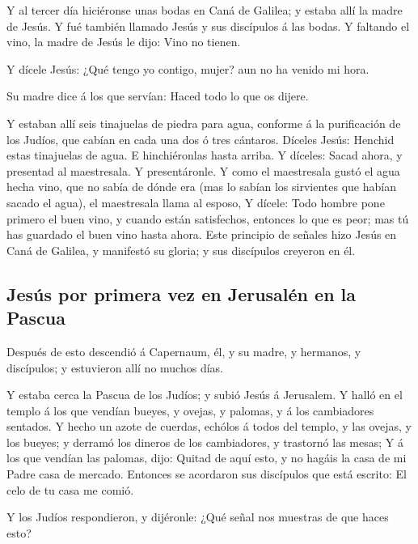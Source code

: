  Y al tercer día hiciéronse unas bodas en Caná de Galilea; y
estaba allí la madre de Jesús.  Y fué también llamado Jesús
y sus discípulos á las bodas.  Y faltando el vino, la madre
de Jesús le dijo: Vino no tienen.

 Y dícele Jesús: ¿Qué tengo yo contigo, mujer? aun no ha
venido mi hora.

 Su madre dice á los que servían: Haced todo lo que os
dijere.

 Y estaban allí seis tinajuelas de piedra para agua,
conforme á la purificación de los Judíos, que cabían en cada una dos ó
tres cántaros.  Díceles Jesús: Henchid estas tinajuelas de
agua. E hinchiéronlas hasta arriba.  Y díceles: Sacad ahora,
y presentad al maestresala. Y presentáronle.  Y como el
maestresala gustó el agua hecha vino, que no sabía de dónde era (mas lo
sabían los sirvientes que habían sacado el agua), el maestresala llama
al esposo,  Y dícele: Todo hombre pone primero el buen
vino, y cuando están satisfechos, entonces lo que es peor; mas tú has
guardado el buen vino hasta ahora.  Este principio de
señales hizo Jesús en Caná de Galilea, y manifestó su gloria; y sus
discípulos creyeron en él.

\hypertarget{jesuxfas-por-primera-vez-en-jerusaluxe9n-en-la-pascua}{%
\subsection{Jesús por primera vez en Jerusalén en la
Pascua}\label{jesuxfas-por-primera-vez-en-jerusaluxe9n-en-la-pascua}}

 Después de esto descendió á Capernaum, él, y su madre, y
hermanos, y discípulos; y estuvieron allí no muchos días.

 Y estaba cerca la Pascua de los Judíos; y subió Jesús á
Jerusalem.  Y halló en el templo á los que vendían bueyes,
y ovejas, y palomas, y á los cambiadores sentados.  Y hecho
un azote de cuerdas, echólos á todos del templo, y las ovejas, y los
bueyes; y derramó los dineros de los cambiadores, y trastornó las mesas;
 Y á los que vendían las palomas, dijo: Quitad de aquí
esto, y no hagáis la casa de mi Padre casa de mercado. 
Entonces se acordaron sus discípulos que está escrito: El celo de tu
casa me comió.

 Y los Judíos respondieron, y dijéronle: ¿Qué señal nos
muestras de que haces esto?

